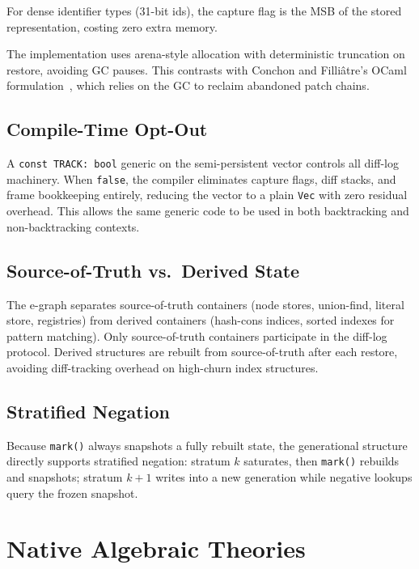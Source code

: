 \documentclass[sigplan,nonacm]{acmart}
\begin{document}
For dense identifier types (31-bit ids), the capture flag is the MSB
of the stored representation, costing zero extra memory.

The implementation uses arena-style allocation with deterministic
truncation on restore, avoiding GC pauses.  This contrasts with
Conchon and Filli\^{a}tre's OCaml formulation~\cite{conchon-filliatre},
which relies on the GC to reclaim abandoned patch chains.

\subsection{Compile-Time Opt-Out}

A \texttt{const TRACK: bool} generic on the semi-persistent vector
controls all diff-log machinery.  When \texttt{false}, the compiler
eliminates capture flags, diff stacks, and frame bookkeeping
entirely, reducing the vector to a plain \texttt{Vec} with zero
residual overhead.  This allows the same generic code to be used in
both backtracking and non-backtracking contexts.

\subsection{Source-of-Truth vs.\ Derived State}

The e-graph separates source-of-truth containers (node stores,
union-find, literal store, registries) from derived containers
(hash-cons indices, sorted indexes for pattern matching).  Only
source-of-truth containers participate in the diff-log protocol.
Derived structures are rebuilt from source-of-truth after each
restore, avoiding diff-tracking overhead on high-churn index
structures.

\subsection{Stratified Negation}

Because \texttt{mark()} always snapshots a fully rebuilt state,
the generational structure directly supports stratified negation:
stratum $k$ saturates, then \texttt{mark()} rebuilds and snapshots;
stratum $k{+}1$ writes into a new generation while negative lookups
query the frozen snapshot.

\section{Native Algebraic Theories}
\end{document}
